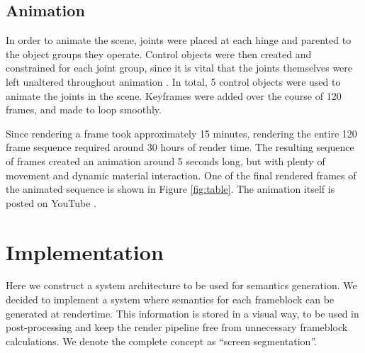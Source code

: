 \documentclass[conference]{IEEEtran}
\begin{document}
\subsection{Animation}
In order to animate the scene, joints were placed at each hinge and parented to the object groups they operate.
Control objects were then created and constrained for each joint group,
since it is vital that the joints themselves were left unaltered throughout animation \cite{rigging}.
In total, 5 control objects were used to animate the joints in the scene.
Keyframes were added over the course of 120 frames, and made to loop smoothly.

Since rendering a frame took approximately 15 minutes,
rendering the entire 120 frame sequence required around 30 hours of render time.
The resulting sequence of frames created an animation around 5 seconds long,
but with plenty of movement and dynamic material interaction.
One of the final rendered frames of the animated sequence is shown in Figure \ref{fig:table}.
The animation itself is posted on YouTube \cite{animation}.

\section{Implementation}
\label{sec:implementation}
Here we construct a system architecture to be used for semantics generation.
We decided to implement a system where semantics for each frameblock
can be generated at rendertime.
This information is stored in a visual way,
to be used in post-processing and keep the render pipeline free from
unnecessary frameblock calculations.
We denote the complete concept as ``screen segmentation''.
\end{document}
